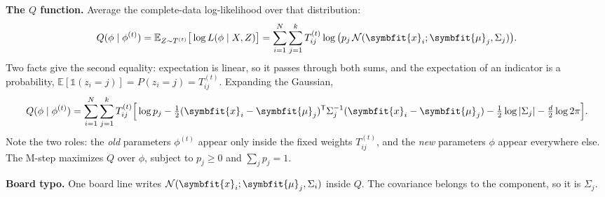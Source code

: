 \documentclass[11pt]{article}
\newcommand{\bm}[1]{\symbfit{#1}}
\newcommand{\vx}{\bm{x}}
\newcommand{\T}{^{\mathsf T}}
\begin{document}
\textbf{The $Q$ function.} Average the complete-data log-likelihood over that distribution:
\[
Q(\phi\mid\phi^{(t)})=\mathbb E_{Z\sim T^{(t)}}\big[\log L(\phi\mid X,Z)\big]=\sum_{i=1}^N\sum_{j=1}^kT_{ij}^{(t)}\log\big(p_j\,\mathcal N(\vx_i;\bm\mu_j,\Sigma_j)\big).
\]
Two facts give the second equality: expectation is linear, so it passes through both sums, and the expectation of an indicator is a probability, $\mathbb E[\mathbb 1(z_i=j)]=P(z_i=j)=T_{ij}^{(t)}$. Expanding the Gaussian,
\[
Q(\phi\mid\phi^{(t)})=\sum_{i=1}^N\sum_{j=1}^kT_{ij}^{(t)}\Big[\log p_j-\tfrac12(\vx_i-\bm\mu_j)\T\Sigma_j^{-1}(\vx_i-\bm\mu_j)-\tfrac12\log|\Sigma_j|-\tfrac d2\log2\pi\Big].
\]
Note the two roles: the \emph{old} parameters $\phi^{(t)}$ appear only inside the fixed weights $T_{ij}^{(t)}$, and the \emph{new} parameters $\phi$ appear everywhere else. The M-step maximizes $Q$ over $\phi$, subject to $p_j\ge0$ and $\sum_jp_j=1$.

\begin{careful}
\textbf{Board typo.} One board line writes $\mathcal N(\vx_i;\bm\mu_j,\Sigma_i)$ inside $Q$. The covariance belongs to the component, so it is $\Sigma_j$.
\end{careful}
\end{document}
